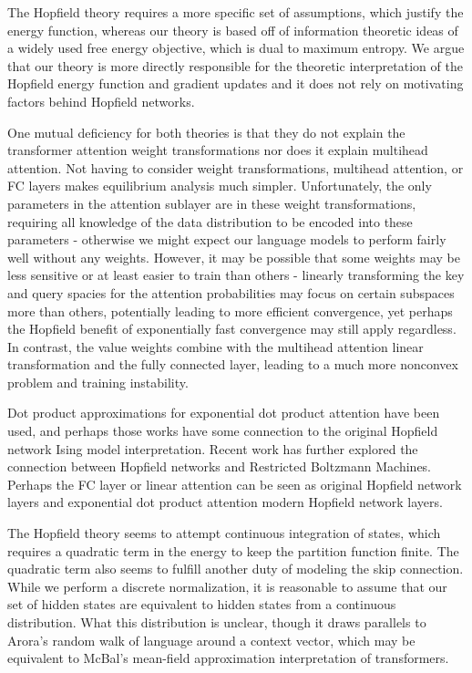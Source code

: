 \documentclass{article}
\begin{document}
The Hopfield theory requires a more specific set of assumptions, which justify the energy function, whereas our theory is based off of information theoretic ideas of a widely used free energy objective, which is dual to maximum entropy. We argue that our theory is more directly responsible for the theoretic interpretation of the Hopfield energy function and gradient updates and it does not rely on motivating factors behind Hopfield networks.

One mutual deficiency for both theories is that they do not explain the transformer attention weight transformations nor does it explain multihead attention. Not having to consider weight transformations, multihead attention, or FC layers makes equilibrium analysis much simpler. Unfortunately, the only parameters in the attention sublayer are in these weight transformations, requiring all knowledge of the data distribution to be encoded into these parameters - otherwise we might expect our language models to perform fairly well without any weights. However, it may be possible that some weights may be less sensitive or at least easier to train than others - linearly transforming the key and query spacies for the attention probabilities may focus on certain subspaces more than others, potentially leading to more efficient convergence, yet perhaps the Hopfield benefit of exponentially fast convergence may still apply regardless. In contrast, the value weights combine with the multihead attention linear transformation and the fully connected layer, leading to a much more nonconvex problem and training instability.

Dot product approximations for exponential dot product attention have been used, and perhaps those works have some connection to the original Hopfield network Ising model interpretation. Recent work \cite{} has further explored the connection between Hopfield networks and Restricted Boltzmann Machines. Perhaps the FC layer or linear attention can be seen as original Hopfield network layers and exponential dot product attention modern Hopfield network layers.

The Hopfield theory seems to attempt continuous integration of states, which requires a quadratic term in the energy to keep the partition function finite. The quadratic term also seems to fulfill another duty of modeling the skip connection. While we perform a discrete normalization, it is reasonable to assume that our set of hidden states are equivalent to hidden states from a continuous distribution. What this distribution is unclear, though it draws parallels to Arora's random walk of language around a context vector, which may be equivalent to McBal's mean-field approximation interpretation of transformers.
\end{document}
